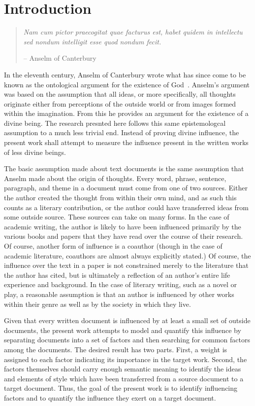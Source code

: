 \documentclass[../dissertation.tex]{subfiles}
\begin{document}

\chapter{Introduction}
\begin{quote}
\textit{Nam cum pictor praecogitat quae facturus est, habet quidem in
intellectu sed nondum intelligit esse quod nondum fecit.}

-- Anselm of Canterbury~\cite{anselm}
\end{quote}
In the eleventh century, Anselm of Canterbury wrote what has since
come to be known as the ontological argument for the existence of
God~\cite{anselm}.  Anselm's argument was based on the assumption that
all ideas, or more specifically, all thoughts originate either from
perceptions of the outside world or from images formed within the
imagination.  From this he provides an argument for the existence of
a divine being.  The research presnted here follows this same
epistemologcal assumption to a much less trivial end.
Instead of proving divine influence, the present work shall attempt to
measure the influence present in the written works of less divine beings.

The basic assumption made about text documents is the same assumption
that Anselm made about the origin of thoughts.  Every word, phrase,
sentence, paragraph, and theme in a document must come from one of two
sources.  Either the author created the thought from within their own
mind, and as such this counts as a literary contribution, or the
author could have transferred ideas from some outside source.  These
sources can take on many forms.  In the case of academic writing, the
author is likely to have been influenced primarily by the various
books and papers that they have read over the course of their
research.  Of course, another form of influence is a coauthor (though
in the case of academic literature, coauthors are almost always
explicitly stated.)  Of course, the influence over the text in a paper
is not constrained merely to the literature that the author has cited,
but is ultimately a reflection of an author's entire life experience
and background.  In the case of literary writing, such as a novel or
play, a reasonable assumption is that an author is influenced by other
works within their genre as well as by the society in which they live.

Given that every written document is influenced by at least a small
set of outside documents, the present work attempts to model and
quantify this influence by separating documents into a set of factors
and then searching for common factors among the documents.  The
desired result has two parts.  First, a weight is assigned to each
factor indicating its importance in the target work.  Second, the
factors themselves should carry enough semantic meaning to identify
the ideas and elements of style which have been transferred from a
source document to a target document.  Thus, the goal of the present
work is to identify influencing factors and to quantify the influence
they exert on a target document.
\end{document}
